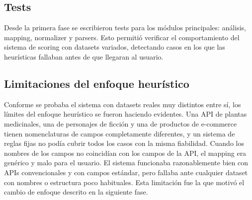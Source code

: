 \subsection*{Tests}
\label{subsec:test1}

Desde la primera fase se escribieron tests para los módulos principales: análisis, mapping, normalizer y parsers. Esto permitió verificar el 
comportamiento del sistema de scoring con datasets variados, detectando casos en los que las heurísticas fallaban antes de que llegaran al usuario.
\subsection*{Limitaciones del enfoque heurístico} \label{subsec:limitaciones1}

Conforme se probaba el sistema con datasets reales muy distintos entre sí, los límites del enfoque heurístico se fueron haciendo evidentes. Una API de plantas medicinales, una de personajes de ficción y una de productos de e-commerce tienen nomenclaturas de campos completamente diferentes, y un sistema de reglas fijas no podía cubrir todos los casos con la misma fiabilidad. Cuando los nombres de los campos no coincidían con los campos de la API, el mapping era genérico y malo para el usuario. El sistema funcionaba razonablemente bien con APIs convencionales y con campos estándar, pero fallaba ante cualquier dataset con nombres o estructura poco habituales. Esta limitación fue la que motivó el cambio de enfoque descrito en la siguiente fase.


